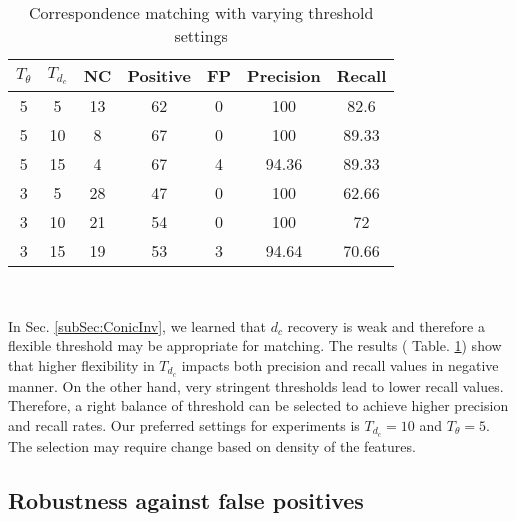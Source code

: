 \documentclass{bmvc2k}
\begin{document}
\begin{table}
\centering
\caption{Correspondence matching with varying threshold settings } \label{table:ThresholdEffect}
\begin{tabular}{ | c | c | c | c | c | c| c |}
\hline
$ T_\theta $ & $ T_{d_c} $ & NC & Positive & FP & Precision & Recall \\ \hline
5 & 5  & 13 & 62 & 0 & 100 & 82.6 \\
5 & 10 & 8 & 67 & 0 & 100 & 89.33\\
5 & 15 & 4 & 67  & 4 & 94.36 & 89.33\\ \hline
3 & 5  & 28 & 47  & 0 & 100 & 62.66 \\
3 & 10 & 21 & 54  & 0 & 100 & 72 \\
3 & 15 & 19 & 53  & 3 & 94.64 & 70.66 \\ \hline
\end{tabular} \\
\label{tab:Exp2}
\end{table}

In Sec. \ref{subSec:ConicInv}, we learned that $ d_c $ recovery is weak and therefore a flexible threshold may be appropriate for matching. 
The results ( Table. \ref{tab:Exp2}) show that higher flexibility in $ T_{d_c} $ impacts both precision and recall values in negative manner. 
On the other hand, very stringent thresholds lead to lower recall values. Therefore, a right balance of threshold can be selected to achieve higher precision and recall rates. Our preferred settings for experiments is $ T_{d_c} = 10 $ and $ T_\theta = 5 $. The selection may require change based on density of the features. 

\subsection{Robustness against false positives}


\end{document}
